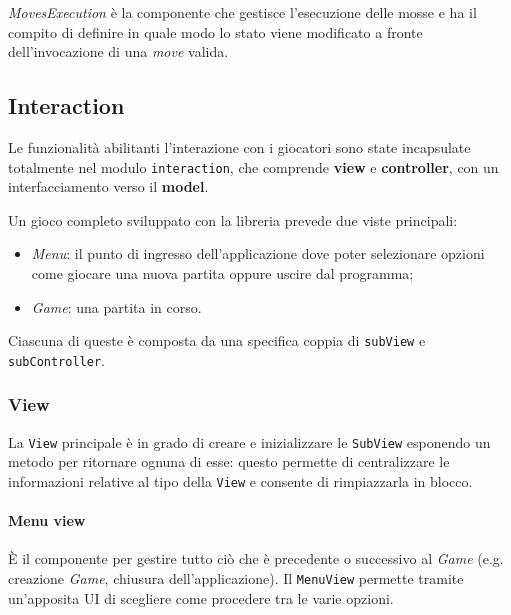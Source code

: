 \textit{MovesExecution} è la componente che gestisce l'esecuzione delle mosse e ha il compito di definire in quale modo lo stato viene modificato a fronte dell'invocazione di una \textit{move} valida.

\subsection{Interaction}

Le funzionalità abilitanti l'interazione con i giocatori sono state incapsulate totalmente nel modulo \texttt{interaction}, che comprende \textbf{view} e \textbf{controller}, con un interfacciamento verso il \textbf{model}.

Un gioco completo sviluppato con la libreria prevede due viste principali:
\begin{itemize}
    \item \textit{Menu}: il punto di ingresso dell'applicazione dove poter selezionare opzioni come giocare una nuova partita oppure uscire dal programma;
    \item \textit{Game}: una partita in corso.
\end{itemize}
%
Ciascuna di queste è composta da una specifica coppia di \texttt{subView} e \texttt{subController}.
%

\subsubsection{View}
La \texttt{View} principale è in grado di creare e inizializzare le \texttt{SubView} esponendo un metodo per ritornare ognuna di esse: questo permette di centralizzare le informazioni relative al tipo della \texttt{View} e consente di rimpiazzarla in blocco. %
\paragraph{Menu view} 
%
È il componente per gestire tutto ciò che è precedente o successivo al \textit{Game} (e.g. creazione \textit{Game}, chiusura dell'applicazione).
%
Il \texttt{MenuView} permette tramite un'apposita UI di scegliere come procedere tra le varie opzioni.
